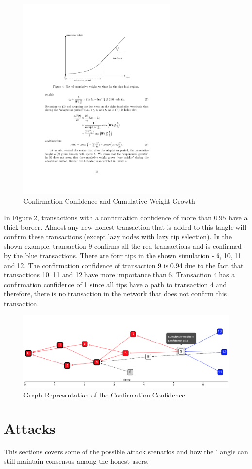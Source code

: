 \begin{figure}[H]
    \centering
    \includegraphics[width=8cm]{images/confirmation-confidence.pdf}
    \caption{Confirmation Confidence and Cumulative Weight Growth \cite{the-tangle}}
    \label{fig:confirmation-confidence}
\end{figure}

In Figure \ref{fig:confirmation-confidence-tangle}, transactions with a confirmation confidence of more than 0.95 have a thick border. Almost any new honest transaction that is added to this tangle will confirm these transactions (except lazy nodes with lazy tip selection). In the shown example, transaction 9 confirms all the red transactions and is confirmed by the blue transactions. There are four tips in the shown simulation - 6, 10, 11 and 12. The confirmation confidence of transaction 9 is 0.94 due to the fact that transactions 10, 11 and 12 have more importance than 6.
Transaction 4 has a confirmation confidence of 1 since all tips have a path to transaction 4 and therefore, there is no transaction in the network that does not confirm this transaction.


\begin{figure}[H]
    \centering
    \includegraphics[width=1.0\textwidth]{images/confirmation-confidence-tangle.png}
    \caption{Graph Representation of the Confirmation Confidence}
    \label{fig:confirmation-confidence-tangle}
\end{figure}



\section{Attacks}\label{attacks}
This sections covers some of the possible attack scenarios and how the Tangle can still maintain consensus among the honest users.
\subsection{}

